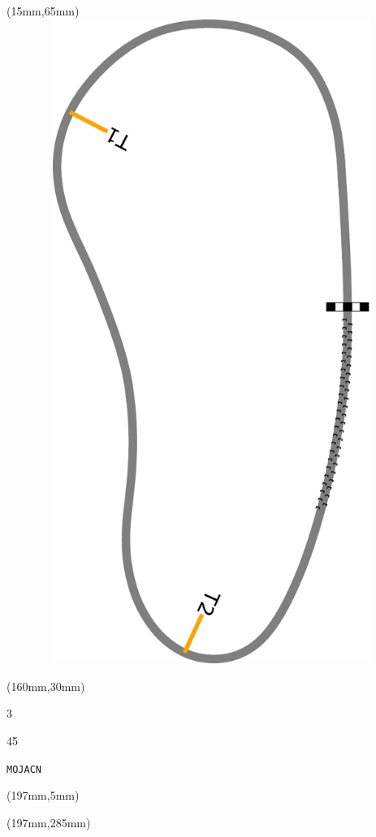 \begin{textblock*}{185mm}(15mm,65mm)%
\centering
\mbox{\includegraphics[width=185mm,height=210mm,keepaspectratio]{PT/MOJACN.pdf}}
\end{textblock*}
\begin{textblock*}{40mm}(160mm,30mm)%
\Large
\par{} 
\par3 
\par45 
\par\hfill\tiny\tt MOJACN\\
\end{textblock*}
\begin{textblock*}{20mm}(197mm,5mm)%
\fbox{\thepage}
\label{MOJACN}
\end{textblock*}
\begin{textblock*}{20mm}(197mm,285mm)%
\fbox{\thepage}
\end{textblock*}

